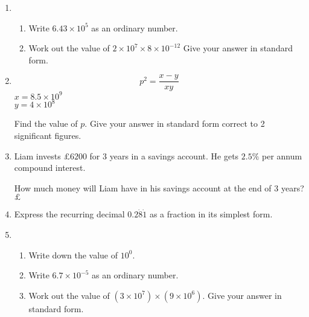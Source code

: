 \begin{enumerate}
    \item %
    \begin{enumerate}
      \item Write $6.43 \times 10^5$ as an ordinary number.\\[1cm]\vspace*{0pt}\hfill\dline
      \item Work out the value of $2 \times 10^7 \times 8 \times 10^{-12}$ Give your answer in standard form.\\[2cm]\vspace*{0pt}\hfill\dline
    \end{enumerate}
    \item %
    $$
    p^2 = \frac{x-y}{xy}
    $$
    $x = 8.5 \times 10^9$\\
    $y = 4 \times 10^8$\par 
    Find the value of $p$. Give your answer in standard form correct to 2 significant figures.\\[3cm]\vspace*{0pt}\hfill\dline
    \item Liam invests $\pounds 6200$ for $3$ years in a savings account. He gets $2.5\%$ per annum compound interest.\par
    How much money will Liam have in his savings account at the end of $3$ years?\\[3cm]\vspace*{0pt}\hfill$\pounds$\dline
    \item Express the recurring decimal $0.2\dot{8}\dot{1}$ as a fraction in its simplest form.\\[2cm]\vspace*{0pt}\hfill\dline
    \item %
    \begin{enumerate}
      \item Write down the value of $10^0$.\\\vspace*{0pt}\hfill\dline
      \item Write $6.7 \times 10^{-5}$ as an ordinary number.\\\vspace*{0pt}\hfill\dline
      \item Work out the value of $(3 \times 10^7) \times (9 \times 10^6)$. Give your answer in standard form.\\[2cm]\vspace*{0pt}\hfill\dline
    \end{enumerate}

\end{enumerate}
